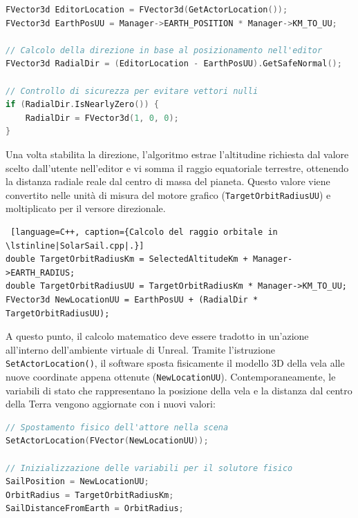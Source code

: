 \begin{lstlisting}[language=C++, caption={Calcolo della posizione e della distanza radiale in \lstinline|SolarSail.cpp|.}]
FVector3d EditorLocation = FVector3d(GetActorLocation()); 
FVector3d EarthPosUU = Manager->EARTH_POSITION * Manager->KM_TO_UU;

// Calcolo della direzione in base al posizionamento nell'editor
FVector3d RadialDir = (EditorLocation - EarthPosUU).GetSafeNormal();

// Controllo di sicurezza per evitare vettori nulli
if (RadialDir.IsNearlyZero()) {
    RadialDir = FVector3d(1, 0, 0); 
}
\end{lstlisting}

Una volta stabilita la direzione, l'algoritmo estrae l'altitudine richiesta dal valore scelto dall'utente nell'editor e vi somma il raggio equatoriale terrestre, ottenendo la distanza radiale reale dal centro di massa del pianeta. Questo valore viene convertito nelle unità di misura del motore grafico (\lstinline|TargetOrbitRadiusUU|) e moltiplicato per il versore direzionale. 

\begin{lstlisting} [language=C++, caption={Calcolo del raggio orbitale in \lstinline|SolarSail.cpp|.}]
double TargetOrbitRadiusKm = SelectedAltitudeKm + Manager->EARTH_RADIUS;
double TargetOrbitRadiusUU = TargetOrbitRadiusKm * Manager->KM_TO_UU;
FVector3d NewLocationUU = EarthPosUU + (RadialDir * TargetOrbitRadiusUU);
\end{lstlisting}

A questo punto, il calcolo matematico deve essere tradotto in un'azione all'interno dell'ambiente virtuale di Unreal. Tramite l'istruzione \lstinline|SetActorLocation()|, il software sposta fisicamente il modello 3D della vela alle nuove coordinate appena ottenute (\lstinline|NewLocationUU|). Contemporaneamente, le variabili di stato che rappresentano la posizione della vela e la distanza dal centro della Terra vengono aggiornate con i nuovi valori:

\begin{lstlisting}[language=C++, caption={Assegnazione delle coordinate e delle variabili di stato in \lstinline|SolarSail.cpp|.}]
// Spostamento fisico dell'attore nella scena
SetActorLocation(FVector(NewLocationUU));

// Inizializzazione delle variabili per il solutore fisico
SailPosition = NewLocationUU; 
OrbitRadius = TargetOrbitRadiusKm;
SailDistanceFromEarth = OrbitRadius;
\end{lstlisting}

